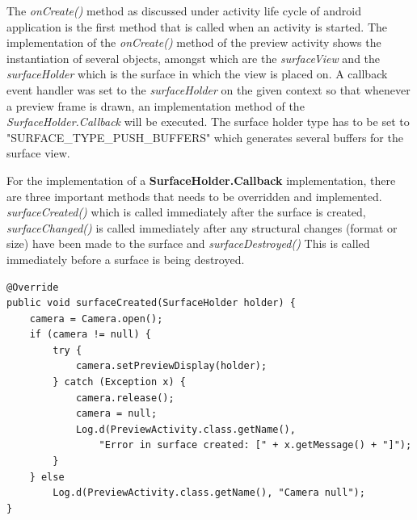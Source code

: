 The {\it onCreate()} method as discussed under activity life cycle of android application is the first method that is called when an activity is started. The implementation of the {\it onCreate()} method of the preview activity shows the instantiation of several objects, amongst which are the {\it surfaceView} and the {\it surfaceHolder} which is the surface in which the view is placed on. A callback event handler was set to the {\it surfaceHolder} on the given context so that whenever a preview frame is drawn, an implementation method of the {\it SurfaceHolder.Callback} will be executed. The surface holder type has to be set to  "SURFACE\_TYPE\_PUSH\_BUFFERS" which generates several buffers for the surface view.

For the implementation of a {\bf SurfaceHolder.Callback} implementation, there are three important methods that needs to be overridden and implemented. {\it surfaceCreated()} which is called immediately after the surface is created, {\it surfaceChanged()} is called immediately after any structural changes (format or size) have been made to the surface and {\it surfaceDestroyed()} This is called immediately before a surface is being destroyed.

\begin{lstlisting}[label=surface-created,caption=Implementation of surfaceCreated method] 
@Override
public void surfaceCreated(SurfaceHolder holder) {
	camera = Camera.open();
	if (camera != null) {
		try {
			camera.setPreviewDisplay(holder);
		} catch (Exception x) {
			camera.release();
			camera = null;
			Log.d(PreviewActivity.class.getName(),
				"Error in surface created: [" + x.getMessage() + "]");
		}
	} else
		Log.d(PreviewActivity.class.getName(), "Camera null");
}
\end{lstlisting}

